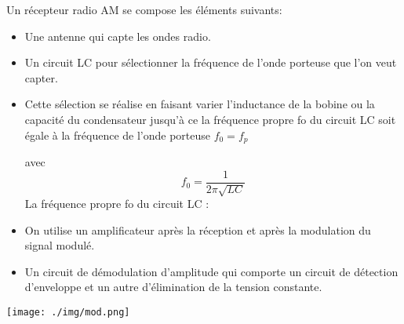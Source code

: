 \documentclass[12pt]{article}
\begin{document}
Un récepteur radio AM se compose les éléments suivants:
\begin{itemize}
	\item Une antenne qui capte les ondes radio.
	\item Un circuit LC pour sélectionner la fréquence de l'onde porteuse que l'on veut capter.

	\item	Cette sélection se réalise en faisant varier l'inductance de la bobine ou la capacité du condensateur jusqu'à ce la fréquence propre fo du
circuit LC soit égale à la fréquence de l'onde porteuse $f_0 = f_p$

avec $$f_0 = \frac{1}{2\pi\sqrt{LC}}$$
La fréquence propre fo du circuit LC :

\item On utilise un amplificateur après la réception et après la modulation du signal modulé.

\item Un circuit de démodulation d'amplitude qui comporte un circuit de détection d'enveloppe et un autre d'élimination de la tension constante.
\end{itemize}


\begin{center}
	\texttt{[image: ./img/mod.png]}
\end{center}


\end{document}
